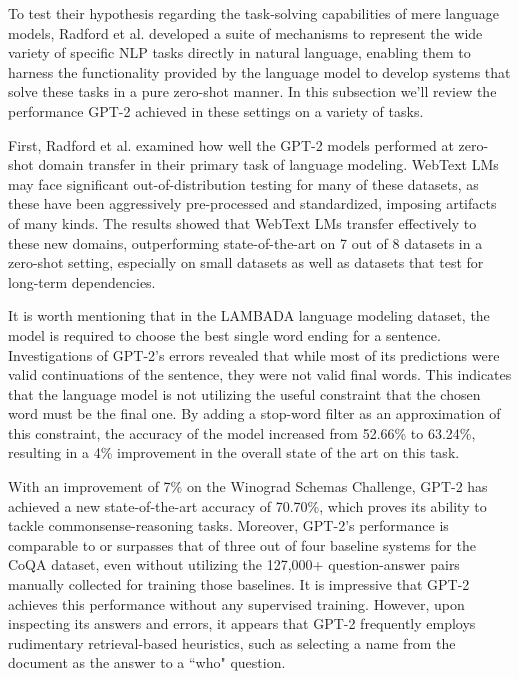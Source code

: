 \documentclass{article}
\begin{document}
To test their hypothesis regarding the task-solving capabilities of mere language models, Radford et al. developed a suite of mechanisms to represent the wide variety of specific NLP tasks directly in natural language, enabling them to harness the functionality provided by the language model to develop systems that solve these tasks in a pure zero-shot manner. In this subsection we'll review the performance GPT-2 achieved in these settings on a variety of tasks.


\medskip
\noindent
First, Radford et al. examined how well the GPT-2 models performed at zero-shot domain transfer in their primary task of language modeling. WebText LMs may face significant out-of-distribution testing for many of these datasets, as these have been aggressively pre-processed and standardized, imposing artifacts of many kinds. The results showed that WebText LMs transfer effectively to these new domains, outperforming state-of-the-art on 7 out of 8 datasets in a zero-shot setting, especially on small datasets as well as datasets that test for long-term dependencies. 

\medskip
\noindent
It is worth mentioning that in the LAMBADA language modeling dataset, the model is required to choose the best single word ending for a sentence. Investigations of GPT-2's errors revealed that while most of its predictions were valid continuations of the sentence, they were not valid final words. This indicates that the language model is not utilizing the useful constraint that the chosen word must be the final one. By adding a stop-word filter as an approximation of this constraint, the accuracy of the model increased from  52.66\% to 63.24\%, resulting in a 4\% improvement in the overall state of the art on this task.

\medskip
\noindent
With an improvement of 7\% on the Winograd Schemas Challenge, GPT-2 has achieved a new state-of-the-art accuracy of 70.70\%, which proves its ability to tackle commonsense-reasoning tasks. Moreover, GPT-2's performance is comparable to or surpasses that of three out of four baseline systems for the CoQA dataset, even without utilizing the 127,000+ question-answer pairs manually collected for training those baselines. It is impressive that GPT-2 achieves this performance without any supervised training. However, upon inspecting its answers and errors, it appears that GPT-2 frequently employs rudimentary retrieval-based heuristics, such as selecting a name from the document as the answer to a ``who" question.
\end{document}
